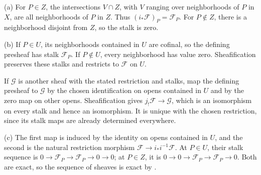 (a) For $P\in Z$, the intersections $V\cap Z$, with $V$ ranging over neighborhoods of $P$ in $X$, are all neighborhoods of $P$ in $Z$. Thus $(i_*\mathscr F)_P=\mathscr F_P$. For $P\notin Z$, there is a neighborhood disjoint from $Z$, so the stalk is zero.

(b) If $P\in U$, its neighborhoods contained in $U$ are cofinal, so the defining presheaf has stalk $\mathscr F_P$. If $P\notin U$, every neighborhood has value zero. Sheafification preserves these stalks and restricts to $\mathscr F$ on $U$.

If $\mathscr G$ is another sheaf with the stated restriction and stalks, map the defining presheaf to $\mathscr G$ by the chosen identification on opens contained in $U$ and by the zero map on other opens. Sheafification gives $j_!\mathscr F\to\mathscr G$, which is an isomorphism on every stalk and hence an isomorphism. It is unique with the chosen restriction, since its stalk maps are already determined everywhere.

(c) The first map is induced by the identity on opens contained in $U$, and the second is the natural restriction morphism $\mathscr F\to i_*i^{-1}\mathscr F$. At $P\in U$, their stalk sequence is $0\to\mathscr F_P\to\mathscr F_P\to0\to0$; at $P\in Z$, it is $0\to0\to\mathscr F_P\to\mathscr F_P\to0$. Both are exact, so the sequence of sheaves is exact by .
